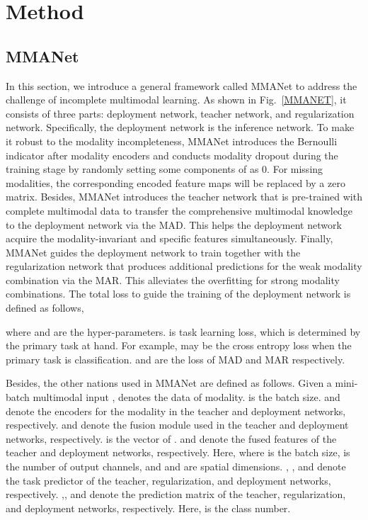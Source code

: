 \documentclass[10pt,twocolumn,letterpaper]{article}
\begin{document}
\section{Method}

\subsection{MMANet}

In this section, we introduce a general framework called MMANet to address the challenge of incomplete multimodal learning. As shown in Fig.~\ref{MMANET}, it consists of three parts: deployment network, teacher network, and regularization network. Specifically, the deployment network is the inference network. To make it robust to the modality incompleteness, MMANet introduces the Bernoulli indicator  after modality encoders and conducts modality dropout during the training stage by randomly setting some components of  as 0. For missing modalities, the corresponding encoded feature maps will be replaced by a zero matrix. Besides, MMANet introduces the teacher network that is pre-trained with complete multimodal data to transfer the comprehensive multimodal knowledge to the deployment network via the MAD. This helps the deployment network acquire the modality-invariant and specific features simultaneously. Finally, MMANet guides the deployment network to train together with the regularization network that produces additional predictions for the weak modality combination via the MAR. This alleviates the overfitting for strong modality combinations. The total loss to guide the training of the deployment network is defined as follows,



 where  and  are the hyper-parameters.  is task learning loss, which is determined by the primary task at hand. For example,  may be the cross entropy loss when the primary task is classification.  and  are the loss of MAD and MAR respectively. 

Besides, the other nations used in MMANet are defined as follows. Given a mini-batch multimodal input ,  denotes the data of  modality.  is the batch size.  and  denote the encoders for the  modality in the teacher and deployment networks, respectively.  and  denote the fusion module used in the teacher and deployment networks, respectively.  is the vector of .  and  denote the fused features of the teacher and deployment networks, respectively. Here, where  is the batch size,  is the number of output channels, and  and  are spatial dimensions. , , and  denote the task predictor of the teacher, regularization, and deployment networks, respectively. ,, and  denote the  prediction matrix of the teacher, regularization, and deployment networks, respectively. Here,  is the class number.
\end{document}
